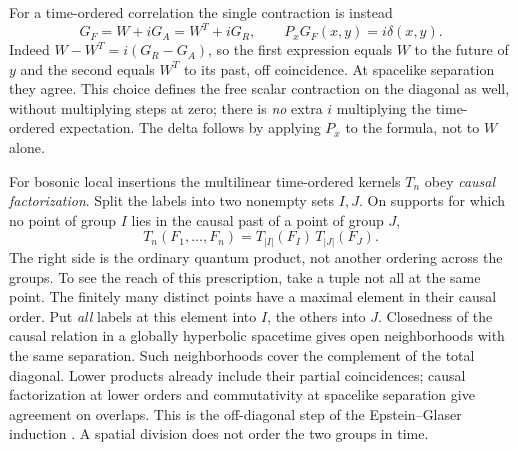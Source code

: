 For a time-ordered correlation the single contraction is instead
\begin{equation}
 G_F=W+iG_A=W^T+iG_R,\qquad P_xG_F(x,y)=i\delta(x,y) .
 \label{f:ext-feynman}
\end{equation}
Indeed $W-W^T=i(G_R-G_A)$, so the first expression equals $W$ to the
future of $y$ and the second equals $W^T$ to its past, off coincidence.
At spacelike separation they agree. This choice defines the free scalar
contraction on the diagonal as well, without multiplying steps at zero;
there is \emph{no} extra $i$ multiplying the time-ordered expectation.
The delta follows by applying $P_x$ to the formula, not to $W$ alone.

For bosonic local insertions the multilinear time-ordered kernels $T_n$
obey \emph{causal factorization}. Split the labels into two nonempty sets
$I,J$. On supports for which no point of group $I$ lies in the causal
past of a point of group $J$,
\begin{equation}
 T_n(F_1,\ldots,F_n)=T_{|I|}(F_I)\,T_{|J|}(F_J) .
 \label{f:ext-factor}
\end{equation}
The right side is the ordinary quantum product, not another ordering
across the groups. To see the reach of this prescription, take a tuple
not all at the same point. The finitely many distinct points have a
maximal element in their causal order. Put \emph{all} labels at this
element into $I$, the others into $J$. Closedness of the causal relation
in a globally hyperbolic spacetime gives open neighborhoods with the
same separation. Such neighborhoods cover the complement of the total
diagonal. Lower products already include their partial coincidences;
causal factorization at lower orders and commutativity at spacelike
separation give agreement on overlaps. This is the off-diagonal step of
the Epstein--Glaser induction \cite{BF,HWT,FR}. A spatial division does
not order the two groups in time.

